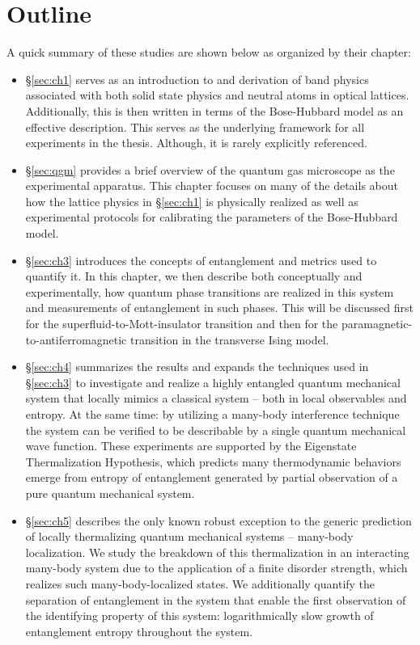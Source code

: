 \section{Outline}

A quick summary of these studies are shown below as organized by their chapter:

\begin{itemize}
 \item \S \ref{sec:ch1} serves as an introduction to and derivation of band physics associated with both solid state physics and neutral atoms in optical lattices. Additionally, this is then written in terms of the Bose-Hubbard model as an effective description. This serves as the underlying framework for all experiments in the thesis. Although, it is rarely explicitly referenced.
 \item \S \ref{sec:qgm} provides a brief overview of the quantum gas microscope as the experimental apparatus. This chapter focuses on many of the details about how the lattice physics in \S \ref{sec:ch1} is physically realized as well as experimental protocols for calibrating the parameters of the Bose-Hubbard model.
 \item \S \ref{sec:ch3} introduces the concepts of entanglement and metrics used to quantify it. In this chapter, we then describe both conceptually and experimentally, how quantum phase transitions are realized in this system and measurements of entanglement in such phases. This will be discussed first for the superfluid-to-Mott-insulator transition and then for the paramagnetic-to-antiferromagnetic transition in the transverse Ising model.
 \item \S \ref{sec:ch4} summarizes the results and expands the techniques used in \S \ref{sec:ch3} to investigate and realize a highly entangled quantum mechanical system that locally mimics a classical system -- both in local observables and entropy. At the same time: by utilizing a many-body interference technique the system can be verified to be describable by a single quantum mechanical wave function. These experiments are supported by the Eigenstate Thermalization Hypothesis, which predicts many thermodynamic behaviors emerge from entropy of entanglement generated by partial observation of a pure quantum mechanical system.
 \item \S \ref{sec:ch5} describes the only known robust exception to the generic prediction of locally thermalizing quantum mechanical systems -- many-body localization. We study the breakdown of this thermalization in an interacting many-body system due to the application of a finite disorder strength, which realizes such many-body-localized states. We additionally quantify the separation of entanglement in the system that enable the first observation of the identifying property of this system: logarithmically slow growth of entanglement entropy throughout the system.

\end{itemize}
